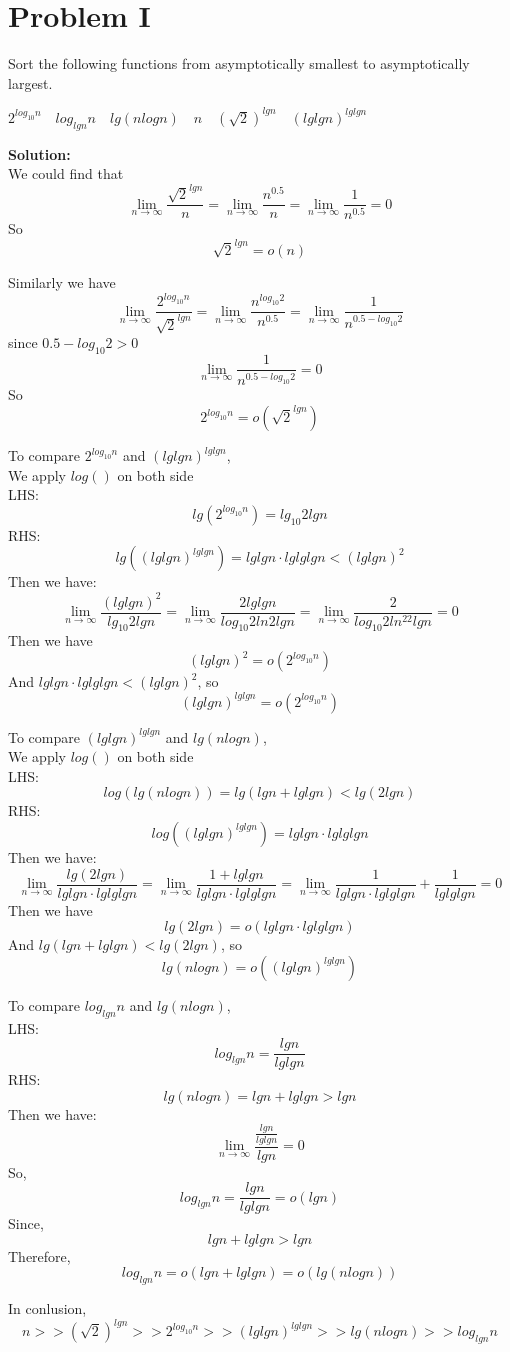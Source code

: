 
\section{Problem I}
Sort the following functions from asymptotically smallest to asymptotically largest.

\begin{center}
	$ 2^{log_{10}{n}} \quad log_{lg{n}}{n} \quad  lg(nlog{n})  \quad  n \quad (\sqrt{2})^{lg{n}} \quad (lglgn)^{lglgn} $
\end{center}

\textbf{Solution:} \\

We could find that
$$\lim_{n\to\infty} \frac{\sqrt{2}^{lgn}}{n} = \lim_{n\to\infty} \frac{n^{0.5}}{n} = \lim_{n\to\infty} \frac{1}{n^{0.5}} = 0$$
So 
$$\sqrt{2}^{lgn} = o(n)$$

Similarly we have
$$\lim_{n\to\infty} \frac{2^{log_{10}n}}{\sqrt{2}^{lgn}} = \lim_{n\to\infty} \frac{n^{log_{10}2}}{n^{0.5}} = \lim_{n\to\infty} \frac{1}{n^{0.5 - log_{10}2}}$$
since $0.5 - log_{10}2 > 0$
$$ \lim_{n\to\infty} \frac{1}{n^{0.5 - log_{10}2}} = 0 $$
So 
$$ 2^{log_{10}n} = o(\sqrt{2}^{lgn})$$

To compare $2^{log_{10}n}$ and $(lglgn)^{lglgn}$,\\
We apply $log()$ on both side\\
LHS:
$$lg(2^{log_{10}n}) = lg_{10}2lgn$$
RHS:
$$lg((lglgn)^{lglgn}) = lglgn\cdot lglglgn < (lglgn)^2$$
Then we have:
$$ \lim_{n\to\infty} \frac{(lglgn)^2}{lg_{10}2lgn} = \lim_{n\to\infty} \frac{2lglgn}{log_{10}2ln2lgn}  = \lim_{n\to\infty} \frac{2}{log_{10}2ln^22lgn} = 0$$
Then we have
$$ (lglgn)^2 = o(2^{log_{10}n}) $$
And $lglgn\cdot lglglgn < (lglgn)^2$, so
$$ (lglgn)^{lglgn} = o(2^{log_{10}n}) $$

To compare $(lglgn)^{lglgn}$ and $lg(nlog{n})$,\\
We apply $log()$ on both side\\
LHS:
$$log(lg(nlog{n})) = lg(lgn + lglgn) < lg(2lgn)$$
RHS:
$$log((lglgn)^{lglgn}) = lglgn\cdot lglglgn$$
Then we have:
$$\lim_{n\to\infty} \frac{lg(2lgn)}{lglgn\cdot lglglgn} = \lim_{n\to\infty} \frac{1 + lglgn}{lglgn\cdot lglglgn}  = \lim_{n\to\infty} \frac{1}{lglgn\cdot lglglgn} + \frac{1}{lglglgn} = 0$$
Then we have
$$ lg(2lgn) = o(lglgn\cdot lglglgn) $$
And $lg(lgn + lglgn) < lg(2lgn)$, so
$$ lg(nlog{n}) = o((lglgn)^{lglgn}) $$

To compare $log_{lg{n}}{n}$ and $lg(nlog{n})$,\\
LHS:
$$log_{lg{n}}{n} = \frac{lgn}{lglgn}$$
RHS:
$$lg(nlog{n}) = lgn + lglgn > lgn$$
Then we have:
$$\lim_{n\to\infty} \frac{\frac{lgn}{lglgn}}{lgn} = 0$$
So, 
$$log_{lg{n}}{n} = \frac{lgn}{lglgn} = o(lgn)$$
Since,
$$lgn + lglgn > lgn$$
Therefore, 
$$log_{lg{n}}{n} = o(lgn + lglgn) = o(lg(nlog{n}))$$

In conlusion, 
$$n >> (\sqrt{2})^{lg{n}} >> 2^{log_{10}{n}} >> (lglgn)^{lglgn} >> lg(nlog{n}) >> log_{lg{n}}{n}$$
